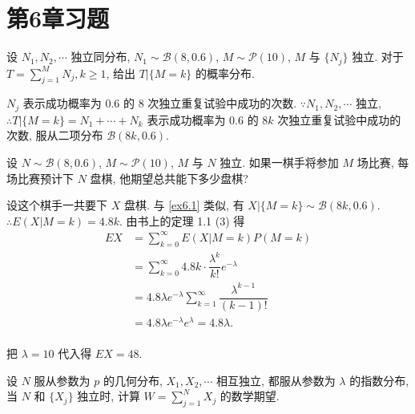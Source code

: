 \documentclass[color=black,device=normal,lang=cn]{elegantnote}
\numberwithin{equation}{section}
\theoremstyle{plain}
\newcounter{exsection}[section]
\numberwithin{exercise}{exsection}
\begin{document}
\section{第6章习题}
\addtocounter{exsection}{6}
\begin{exercise}[a]\label{ex6.1}
    设 $N_1,N_2,\cdots$ 独立同分布, $N_1\sim\mathcal{B}(8,0.6)$, $M\sim\mathcal{P}(10)$, $M$ 与 $\{N_j\}$ 独立. 对于 $T=\sum\limits_{j=1}^MN_j,k\geq1$, 给出 $T|\{M=k\}$ 的概率分布.
\end{exercise}
\begin{solution}
    $N_j$ 表示成功概率为 $0.6$ 的 $8$ 次独立重复试验中成功的次数. $\because N_1,N_2,\cdots$ 独立, $\therefore T|\{M=k\}=N_1+\cdots+N_k$ 表示成功概率为 $0.6$ 的 $8k$ 次独立重复试验中成功的次数, 服从二项分布 $\mathcal{B}(8k,0.6)$.
\end{solution}
\begin{exercise}%
    设 $N\sim\mathcal{B}(8,0.6)$, $M\sim\mathcal{P}(10)$, $M$ 与 $N$ 独立. 如果一棋手将参加 $M$ 场比赛, 每场比赛预计下 $N$ 盘棋, 他期望总共能下多少盘棋?
\end{exercise}
\begin{solution}
    设这个棋手一共要下 $X$ 盘棋. 与 \ref{ex6.1} 类似, 有 $X|\{M=k\}\sim\mathcal{B}(8k,0.6)$. $\therefore E(X|M=k)=4.8k$. 由书上的定理 1.1 (3) 得
    \begin{align*}
        EX & =\sum\limits_{k=0}^\infty E(X|M=k)P(M=k) \\
        & =\sum\limits_{k=0}^\infty4.8k\cdot\dfrac{\lambda^k}{k!}e^{-\lambda} \\
        & =4.8\lambda e^{-\lambda}\sum\limits_{k=1}^\infty\dfrac{\lambda^{k-1}}{(k-1)!} \\
        & =4.8\lambda e^{-\lambda}e^\lambda=4.8\lambda. \\
    \end{align*}

    把 $\lambda=10$ 代入得 $EX=48$.
\end{solution}
\begin{exercise}%
    设 $N$ 服从参数为 $p$ 的几何分布, $X_1,X_2,\cdots$ 相互独立, 都服从参数为 $\lambda$ 的指数分布, 当 $N$ 和 $\{X_j\}$ 独立时, 计算 $W=\sum\limits_{j=1}^NX_j$ 的数学期望.
\end{exercise}
\end{document}
